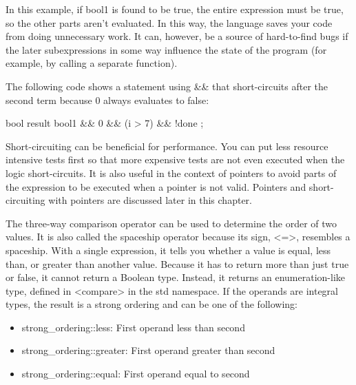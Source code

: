 
In this example, if bool1 is found to be true, the entire expression must be true, so the other parts aren’t evaluated. In this way, the language saves your code from doing unnecessary work. It can, however, be a source of hard-to-find bugs if the later subexpressions in some way influence the state of the program (for example, by calling a separate function).

The following code shows a statement using \&\& that short-circuits after the second term because 0 always evaluates to false:

\begin{cpp}
bool result { bool1 && 0 && (i > 7) && !done };
\end{cpp}

Short-circuiting can be beneficial for performance. You can put less resource intensive tests first so that more expensive tests are not even executed when the logic short-circuits. It is also useful in the context of pointers to avoid parts of the expression to be executed when a pointer is not valid. Pointers and short-circuiting with pointers are discussed later in this chapter.


The three-way comparison operator can be used to determine the order of two values. It is also called the spaceship operator because its sign, <=>, resembles a spaceship. With a single expression, it tells you whether a value is equal, less than, or greater than another value. Because it has to return more than just true or false, it cannot return a Boolean type. Instead, it returns an enumeration-like type, defined in <compare> in the std namespace. If the operands are integral types, the result is a strong ordering and can be one of the following:

\begin{itemize}
\item
strong\_ordering::less: First operand less than second

\item
strong\_ordering::greater: First operand greater than second

\item
strong\_ordering::equal: First operand equal to second
\end{itemize}

